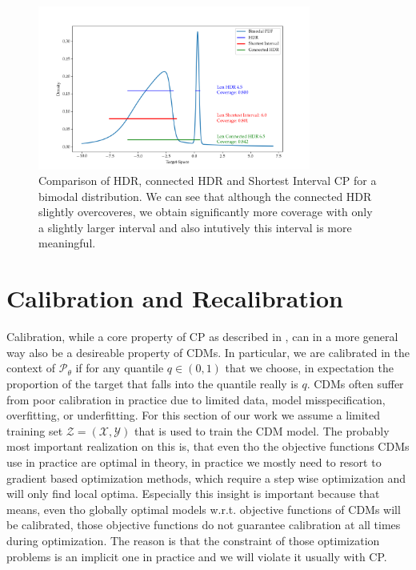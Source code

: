 \begin{figure}
    \centering
    \includegraphics[width=0.8\textwidth]{resources/bimodal_distribution_hdr_vs_shortest_interval.png}
    \caption[Comparison of HDR, connected HDR and Shortest Interval CP]{Comparison of HDR, connected HDR and Shortest Interval CP for a bimodal distribution. We can see that although the connected HDR slightly overcoveres, we obtain significantly more coverage with only a slightly larger interval and also intutively this interval is more meaningful.}
    \label{fig:hdr_vs_shortest_intervals}
\end{figure}

\section{Calibration and Recalibration}\label{sec:calibration}

Calibration, while a core property of CP as described in , can in a more general way also be a desireable property of CDMs. In particular, we are calibrated in the context of $\mathscr{P}_\theta$ if for any quantile $q\in(0,1)$ that we choose, in expectation the proportion of the target that falls into the quantile really is $q$. CDMs often suffer from poor calibration in practice due to limited data, model misspecification, overfitting, or underfitting. For this section of our work we assume a limited training set $\mathcal{Z} = (\mathcal{X}, \mathcal{Y})$ that is used to train the CDM model. The probably most important realization on this is, that even tho the objective functions CDMs use in practice are optimal in theory, in practice we mostly need to resort to gradient based optimization methods, which require a step wise optimization and will only find local optima. Especially this insight is important because that means, even tho globally optimal models w.r.t. objective functions of CDMs will be calibrated, those objective functions do not guarantee calibration at all times during optimization. The reason is that the constraint of those optimization problems is an implicit one in practice and we will violate it usually with CP.

